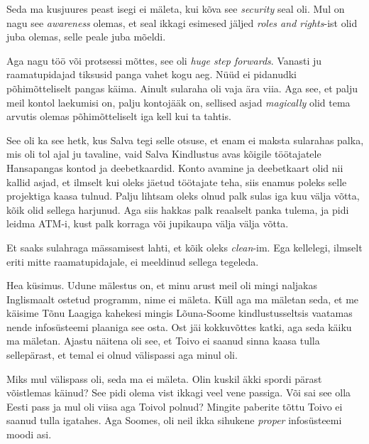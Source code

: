 
Seda ma kusjuures peast isegi ei mäleta, kui kõva see \emph{security} seal oli. 
Mul on nagu see \emph{awareness} olemas, et seal ikkagi esimesed jäljed 
\emph{roles and rights}-ist olid juba olemas, selle peale juba mõeldi. 

Aga nagu töö või protsessi mõttes, see oli \emph{huge step forwards}. Vanasti 
ju raamatupidajad tiksusid panga vahet kogu aeg. Nüüd ei pidanudki 
põhimõtteliselt pangas käima. Ainult  sularaha oli vaja ära viia. Aga see, et 
palju meil kontol laekumisi on, palju kontojääk on, sellised asjad 
\emph{magically} olid tema arvutis olemas põhimõtteliselt iga kell kui ta  
tahtis. 

See oli ka see hetk, kus Salva tegi selle otsuse, et enam ei maksta sularahas 
palka, mis oli tol ajal ju tavaline, vaid Salva Kindlustus avas kõigile 
töötajatele Hansapangas kontod ja deebetkaardid. Konto avamine ja deebetkaart 
olid nii kallid asjad, et ilmselt kui oleks jäetud  töötajate teha, siis enamus 
poleks selle projektiga kaasa tulnud. Palju lihtsam oleks olnud palk sulas iga 
kuu välja võtta, kõik olid sellega harjunud. Aga siis hakkas palk reaalselt panka tulema, 
ja pidi leidma ATM-i, kust palk korraga või jupikaupa välja välja võtta. 


Et saaks sulahraga mässamisest lahti, et kõik oleks \emph{clean}-im. Ega 
kellelegi, ilmselt eriti mitte raamatupidajale, ei meeldinud sellega tegeleda. 


Hea küsimus. Udune mälestus on, et minu arust meil oli mingi naljakas 
Inglismaalt ostetud programm, nime ei mäleta. Küll aga ma mäletan seda, et me 
käisime  Tõnu Laagiga kahekesi mingis Lõuna-Soome 
kindlustusseltsis vaatamas nende infosüsteemi plaaniga see osta. Ost 
jäi kokkuvõttes katki, aga seda käiku ma mäletan. Ajastu näitena oli see, 
et Toivo ei saanud sinna kaasa tulla sellepärast, et 
temal ei olnud välispassi aga minul oli.


Miks mul välispass oli, seda ma ei mäleta. Olin kuskil äkki spordi pärast 
võistlemas käinud? See pidi olema vist ikkagi veel 
vene passiga. Või sai see olla Eesti pass ja mul oli viisa aga Toivol polnud? 
Mingite paberite tõttu Toivo ei saanud tulla igatahes. Aga Soomes, oli neil 
ikka sihukene \emph{proper} infosüsteemi moodi asi. 

